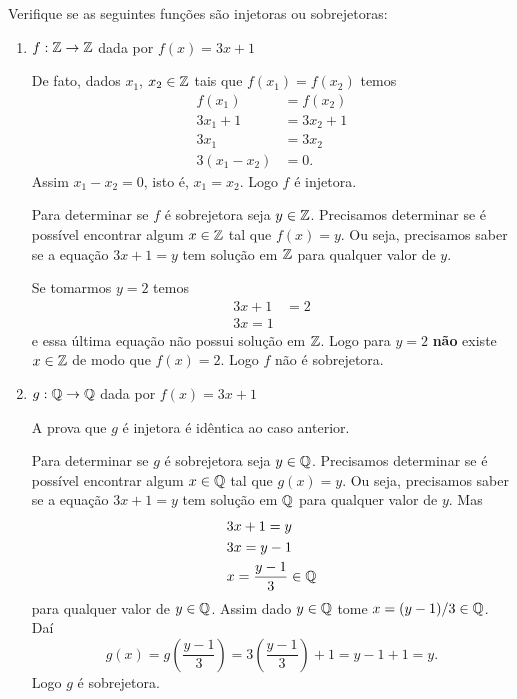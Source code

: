 \begin{exemplos}
	Verifique se as seguintes funções são injetoras ou sobrejetoras:
	\begin{enumerate}
		\item $f : \mathbb{Z} \to \mathbb{Z}$ dada por $f(x) = 3x + 1$
		\begin{solucao}
			De fato, dados $x_1$, $x_2 \in \mathbb{Z}$ tais que $f(x_1) = f(x_2)$ temos
			\begin{align*}
				f(x_1) &= f(x_2)\\
				3x_1 + 1 &= 3x_2 + 1\\
				3x_1 &= 3x_2\\
				3(x_1 - x_2) &= 0.
			\end{align*}
			Assim $x_1 - x_2 = 0$, isto é, $x_1 = x_2$. Logo $f$ é injetora.

			Para determinar se $f$ é sobrejetora seja $y \in \mathbb{Z}$. Precisamos determinar se é possível encontrar algum $x \in \mathbb{Z}$ tal que $f(x) = y$. Ou seja, precisamos saber se a equação $3x + 1 = y$ tem solução em $\mathbb{Z}$ para qualquer valor de $y$.

			Se tomarmos $y = 2$ temos
			\begin{align*}
				3x + 1 &= 2\\
				3x = 1
			\end{align*}
			e essa última equação não possui solução em $\mathbb{Z}$. Logo para $y = 2$ \textbf{não} existe $x \in \mathbb{Z}$ de modo que $f(x) = 2$. Logo $f$ não é sobrejetora.
		\end{solucao}

		\item $g : \mathbb{Q} \to \mathbb{Q}$ dada por $f(x) = 3x + 1$
		\begin{solucao}
			A prova que $g$ é injetora é idêntica ao caso anterior.

			Para determinar se $g$ é sobrejetora seja $y \in \mathbb{Q}$. Precisamos determinar se é possível encontrar algum $x \in \mathbb{Q}$ tal que $g(x) = y$. Ou seja, precisamos saber se a equação $3x + 1 = y$ tem solução em $\mathbb{Q}$ para qualquer valor de $y$. Mas
			\begin{align*}
				&3x + 1 = y\\
				&3x = y - 1\\
				&x = \dfrac{y - 1}{3} \in \mathbb{Q}
			\end{align*}
			para qualquer valor de $y \in \mathbb{Q}$. Assim dado $y \in \mathbb{Q}$ tome $x = (y - 1)/3 \in \mathbb{Q}$. Daí
			\[
				g(x) = g\left(\dfrac{y - 1}{3}\right) = 3\left(\dfrac{y - 1}{3}\right) + 1 = y - 1 + 1 = y. 
			\]
			Logo $g$ é sobrejetora.
		\end{solucao}


\end{enumerate}
\end{exemplos}
